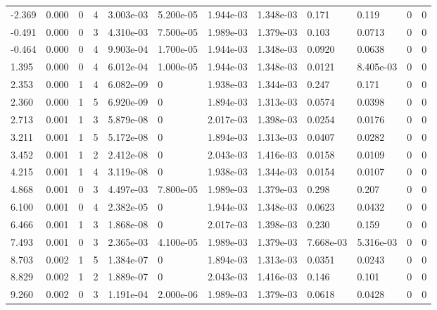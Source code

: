 \documentclass[preview]{standalone}
\begin{document}
{{\begin{tabular}{L{1.2cm}C{1.2cm} C{0.3cm}C{0.5cm} C{1.4cm}C{1.4cm} C{1.4cm}C{1.4cm} C{1.6cm}C{1.6cm} C{1.6cm}C{1.6cm}}
  -2.369  &  0.000  & 0     &  4 &  3.003e-03  & 5.200e-05  &  1.944e-03&   1.348e-03& 0.171 & 0.119   &  0 & 0  \\ 
  -0.491  &  0.000  & 0     &  3 &  4.310e-03  & 7.500e-05  &  1.989e-03&   1.379e-03& 0.103 & 0.0713   &  0 & 0  \\ 
  -0.464  &  0.000  & 0     &  4 &  9.903e-04  & 1.700e-05  &  1.944e-03&   1.348e-03& 0.0920 & 0.0638   &  0 & 0  \\ 
  1.395  &  0.000  & 0     &  4 &  6.012e-04  & 1.000e-05  &  1.944e-03&   1.348e-03& 0.0121 & 8.405e-03   &  0 & 0  \\ 
  2.353  &  0.000  & 1     &  4 &  6.082e-09  & 0  &  1.938e-03&   1.344e-03& 0.247 & 0.171   &  0 & 0  \\ 
  2.360  &  0.000  & 1     &  5 &  6.920e-09  & 0  &  1.894e-03&   1.313e-03& 0.0574 & 0.0398   &  0 & 0  \\ 
  2.713  &  0.001  & 1     &  3 &  5.879e-08  & 0  &  2.017e-03&   1.398e-03& 0.0254 & 0.0176   &  0 & 0  \\ 
  3.211  &  0.001  & 1     &  5 &  5.172e-08  & 0  &  1.894e-03&   1.313e-03& 0.0407 & 0.0282   &  0 & 0  \\ 
  3.452  &  0.001  & 1     &  2 &  2.412e-08  & 0  &  2.043e-03&   1.416e-03& 0.0158 & 0.0109   &  0 & 0  \\ 
  4.215  &  0.001  & 1     &  4 &  3.119e-08  & 0  &  1.938e-03&   1.344e-03& 0.0154 & 0.0107   &  0 & 0  \\ 
  4.868  &  0.001  & 0     &  3 &  4.497e-03  & 7.800e-05  &  1.989e-03&   1.379e-03& 0.298 & 0.207   &  0 & 0  \\ 
  6.100  &  0.001  & 0     &  4 &  2.382e-05  & 0  &  1.944e-03&   1.348e-03& 0.0623 & 0.0432   &  0 & 0  \\ 
  6.466  &  0.001  & 1     &  3 &  1.868e-08  & 0  &  2.017e-03&   1.398e-03& 0.230 & 0.159   &  0 & 0  \\ 
  7.493  &  0.001  & 0     &  3 &  2.365e-03  & 4.100e-05  &  1.989e-03&   1.379e-03& 7.668e-03 & 5.316e-03   &  0 & 0  \\ 
  8.703  &  0.002  & 1     &  5 &  1.384e-07  & 0  &  1.894e-03&   1.313e-03& 0.0351 & 0.0243   &  0 & 0  \\ 
  8.829  &  0.002  & 1     &  2 &  1.889e-07  & 0  &  2.043e-03&   1.416e-03& 0.146 & 0.101   &  0 & 0  \\ 
  9.260  &  0.002  & 0     &  3 &  1.191e-04  & 2.000e-06  &  1.989e-03&   1.379e-03& 0.0618 & 0.0428   &  0 & 0  \\ 

\end{tabular}}}
\end{document}
